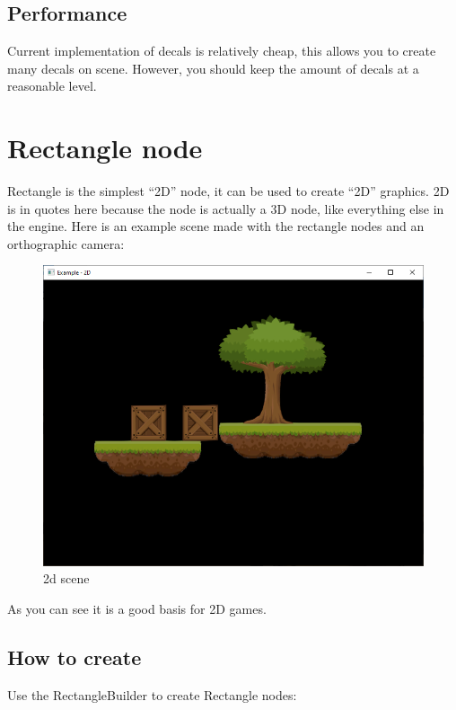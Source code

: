 \documentclass[
]{book}
\theoremstyle{definition}
\theoremstyle{definition}
\theoremstyle{definition}
\theoremstyle{definition}
\theoremstyle{remark}
\begin{document}
\subsection{Performance}\label{performance-6}

Current implementation of decals is relatively cheap, this allows you to create many decals on scene. However, you should keep the amount of decals at a reasonable level.

\section{Rectangle node}\label{rectangle-node}

Rectangle is the simplest ``2D'' node, it can be used to create ``2D'' graphics. 2D is in quotes here because the node is actually a 3D node, like everything else in the engine. Here is an example scene made with the rectangle nodes and an orthographic camera:

\begin{figure}
\centering
\includegraphics{images/scene_2d_scene.PNG}
\caption{2d scene}
\end{figure}

As you can see it is a good basis for 2D games.

\subsection{How to create}\label{how-to-create-8}

Use the RectangleBuilder to create Rectangle nodes:
\end{document}
